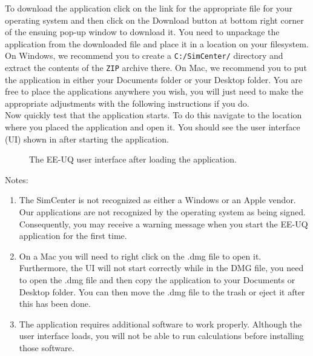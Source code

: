 To download the \getsoftwarename{} application click on the link for
the appropriate file for your operating system and then click on the
Download button at bottom right corner of the ensuing pop-up window to
download it. You need to unpackage the application from the downloaded
file and place it in a location on your filesystem. On Windows, we
recommend you to create a \texttt{C:/SimCenter/\getsoftwarename{}}
directory and extract the contents of the \texttt{ZIP} archive
there. On Mac, we recommend you to put the application in either your
Documents folder or your Desktop folder. You are free to place the
applications anywhere you wish, you will just need to make the
appropriate adjustments with the following instructions if you do. \\

Now quickly test that the application starts. To do this navigate to
the location where you placed the application and open it. You should
see the user interface (UI) shown in  after
starting the application.\\

\begin{figure}[!htbp]
  \caption{The EE-UQ user interface after loading the application.}
  \label{fig:app_UI}
\end{figure}

Notes:
\begin{enumerate}
\item The SimCenter is not recognized as either a Windows or an Apple vendor. Our applications are not recognized by the operating system as being signed. Consequently, you may receive a warning message when you start the EE-UQ application for the first time.
\item  On a Mac you will need to right click on the .dmg file to open it. Furthermore, the UI will not start correctly while in the DMG file, you need to open the .dmg file and then copy the \getsoftwarename{} application to your Documents or Desktop folder. You can then move the .dmg file to the trash or eject it after this has been done.
\item  The \getsoftwarename{} application requires additional software to work properly. Although the user interface loads, you will not be able to run calculations before installing those software.
\end{enumerate}



